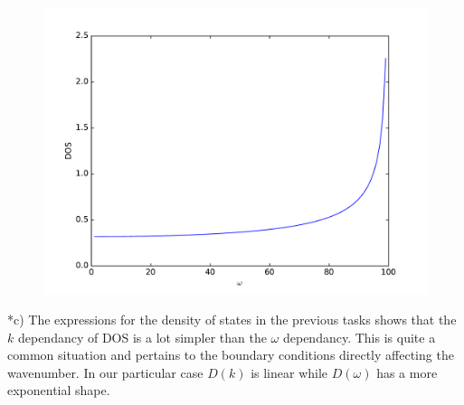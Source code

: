 \documentclass[a4paper]{article}
\begin{document}
\begin{section}
\begin{subsection}
\begin{align*}
		\end{align*}
		\begin{figure}[H]
			\includegraphics[width = 0.8\linewidth]{2b.pdf}
			\center
		\end{figure}
	\end{subsection}
	\begin{subsection}*{c)}
		The expressions for the density of states in the previous tasks shows that the $k$ dependancy of DOS is a lot simpler than the $\omega$ dependancy. This is quite a common situation and pertains to the boundary conditions directly affecting the wavenumber. In our particular case $D(k)$ is linear while $D(\omega)$ has a more exponential shape.
	\end{subsection}
\end{section}
\end{document}
